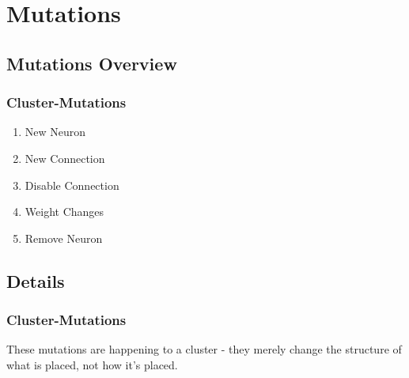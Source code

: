 \newpage
\section{Mutations}

\subsection{Mutations Overview}

	\subsubsection{Cluster-Mutations}
	\begin{enumerate}\itemsep0pt
	\item New Neuron
	\item New Connection
	\item Disable Connection
	\item Weight Changes
	\item Remove Neuron
	\end{enumerate}

\subsection{Details}

\subsubsection{Cluster-Mutations}

These mutations are happening to a cluster - they merely change the structure of what is placed, not how it's placed.

